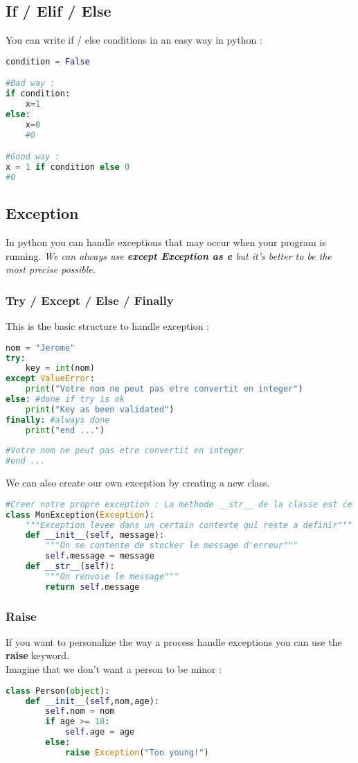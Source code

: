 \documentclass[a4paper, 12pt, titlepage]{scrartcl} %
\begin{document}
\subsection{If / Elif / Else}
\label{IEE}
You can write if / else conditions in an easy way in python :
\begin{lstlisting}[language=Python]
condition = False

#Bad way :
if condition:
	x=1
else:
	x=0
	#0

#Good way :
x = 1 if condition else 0
#0
\end{lstlisting} \vspace{5mm}

\subsection{Exception}
In python you can handle exceptions that may occur when your program is running. \textit{We can always use \textbf{except Exception as e} but it's better to be the most precise possible.}
\subsubsection{Try / Except / Else / Finally}
This is the basic structure to handle exception :
\label{TEEF}
\begin{lstlisting}[language=Python]
nom = "Jerome"
try:
	key = int(nom)
except ValueError:
	print("Votre nom ne peut pas etre convertit en integer")
else: #done if try is ok
	print("Key as been validated")
finally: #always done
	print("end ...")
	
#Votre nom ne peut pas etre convertit en integer
#end ...
\end{lstlisting} \vspace{5mm}

We can also create our own exception by creating a new class.
\begin{lstlisting}[language=Python]
#Creer notre propre exception : La methode __str__ de la classe est ce qui est appele pour afficher le message d'erreur
class MonException(Exception):
    """Exception levee dans un certain contexte qui reste a definir"""
    def __init__(self, message):
        """On se contente de stocker le message d'erreur"""
        self.message = message
    def __str__(self):
        """On renvoie le message"""
        return self.message
\end{lstlisting} \vspace{5mm}

\subsubsection{Raise}
\label{Raise}
If you want to personalize the way a process handle exceptions you can use the \textbf{raise} keyword. \\
Imagine that we don't want a person to be minor :
\begin{lstlisting}[language=Python]
class Person(object):
    def __init__(self,nom,age):
        self.nom = nom
        if age >= 18:
            self.age = age
        else:
            raise Exception("Too young!")
\end{lstlisting} \vspace{5mm}
\end{document}
